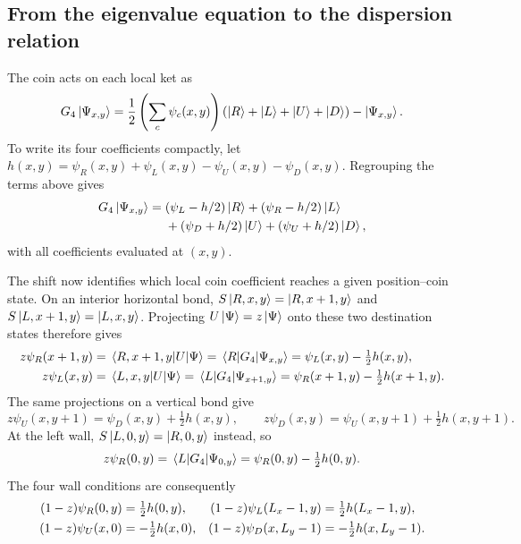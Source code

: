 \subsection{From the eigenvalue equation to the dispersion relation}

The coin acts on each local ket as
\[
 G_4\ket{\Psi_{x,y}}
 =\frac12\left(\sum_c\psi_c(x,y)\right)
             (\ket{R}+\ket{L}+\ket{U}+\ket{D})
  -\ket{\Psi_{x,y}}.
\]
To write its four coefficients compactly, let
$h(x,y)=\psi_R(x,y)+\psi_L(x,y)-\psi_U(x,y)-\psi_D(x,y)$.
Regrouping the terms above gives
\begin{align}
 G_4\ket{\Psi_{x,y}}={}&
  (\psi_L-h/2)\ket{R}+(\psi_R-h/2)\ket{L}\notag\\
 &+(\psi_D+h/2)\ket{U}+(\psi_U+h/2)\ket{D},
 \label{eq:appendix-grover-coin-action}
\end{align}
with all coefficients evaluated at $(x,y)$.

The shift now identifies which local coin coefficient reaches a given
position--coin state. On an interior horizontal bond,
$S\ket{R,x,y}=\ket{R,x+1,y}$ and
$S\ket{L,x+1,y}=\ket{L,x,y}$. Projecting
$U\ket{\Psi}=z\ket{\Psi}$ onto these two destination states therefore gives
\begin{align}
 z\psi_R(x+1,y)
 &=\matrixel{R,x+1,y}{U}{\Psi}
  =\matrixel{R}{G_4}{\Psi_{x,y}}
  =\psi_L(x,y)-\tfrac12h(x,y),\notag\\
 z\psi_L(x,y)
 &=\matrixel{L,x,y}{U}{\Psi}
  =\matrixel{L}{G_4}{\Psi_{x+1,y}}
  =\psi_R(x+1,y)-\tfrac12h(x+1,y).
 \label{eq:appendix-grover-bond}
\end{align}
The same projections on a vertical bond give
\begin{equation}
 z\psi_U(x,y+1)=\psi_D(x,y)+\tfrac12h(x,y),\qquad
 z\psi_D(x,y)=\psi_U(x,y+1)+\tfrac12h(x,y+1).
 \label{eq:appendix-grover-vertical-bond}
\end{equation}
At the left wall, $S\ket{L,0,y}=\ket{R,0,y}$ instead, so
\[
 z\psi_R(0,y)=\matrixel{L}{G_4}{\Psi_{0,y}}
             =\psi_R(0,y)-\tfrac12h(0,y).
\]
The four wall conditions are consequently
\begin{align}
 (1-z)\psi_R(0,y)&=\tfrac12h(0,y),&
 (1-z)\psi_L(L_x-1,y)&=\tfrac12h(L_x-1,y),\notag\\
 (1-z)\psi_U(x,0)&=-\tfrac12h(x,0),&
 (1-z)\psi_D(x,L_y-1)&=-\tfrac12h(x,L_y-1).
 \label{eq:appendix-grover-walls}
\end{align}

